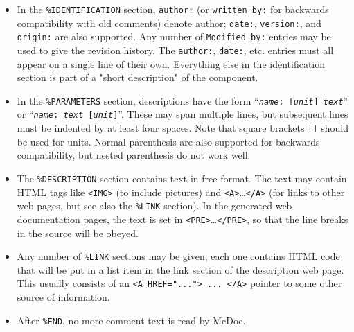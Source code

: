 \begin{itemize}
\item In the \verb+%IDENTIFICATION+
  section, \verb+author:+ (or \verb+written by:+ for backwards
  compatibility with old comments) denote author; \verb+date:+,
  \verb+version:+, and \verb+origin:+ are also supported. Any number of
  \verb+Modified by:+ entries may be used to give the revision history.
  The \verb+author:+, \verb+date:+, etc. entries must all
  appear on a single line of their own. Everything else in the
  identification section is part of a "short description" of the
  component.
\item In the \verb+%PARAMETERS+
  section, descriptions have the form
  \hbox{``\texttt{{\it name\/}:~[{\it unit\/}] {\it text\/}}''}
  or \hbox{``\texttt{{\it name\/}:~{\it text\/} [{\it unit\/}]}''}.
  These may span multiple lines, but subsequent lines must be
  indented by at least four spaces. Note that square brackets \verb+[]+ should
  be used for units. Normal parenthesis are also supported for backwards
  compatibility, but nested parenthesis do not work well.
\item The \verb+%DESCRIPTION+
  section contains text in free format. The text may contain HTML tags
  like \verb+<IMG>+ (to include pictures) and
  \verb+<A>+\ldots\verb+</A>+
  (for links to other web pages, but see also the \verb+%LINK+
  section). In the generated web documentation pages, the text is set in
  \verb+<PRE>+\ldots\verb+</PRE>+, so that the line breaks in the source
  will be obeyed.
\item Any number of \verb+%LINK+
  sections may be given; each one contains HTML code that will be put in
  a list item in the link section of the description web page. This
  usually consists of an \verb+<A HREF="..."> ... </A>+ pointer to some
  other source of information.
\item After \verb+%END+, no more comment text is read by McDoc.
\end{itemize}
